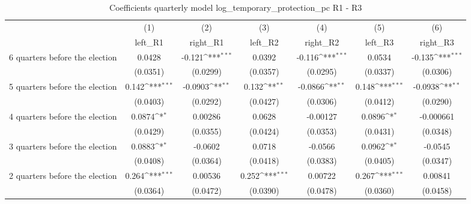 \begin{table}[htbp]\centering
\def\sym#1{\ifmmode^{#1}\else\(^{#1}\)\fi}
\caption{Coefficients quarterly model log\_temporary\_protection\_pc R1 - R3}
\begin{tabular}{l*{6}{c}}
\hline\hline
                    &\multicolumn{1}{c}{(1)}&\multicolumn{1}{c}{(2)}&\multicolumn{1}{c}{(3)}&\multicolumn{1}{c}{(4)}&\multicolumn{1}{c}{(5)}&\multicolumn{1}{c}{(6)}\\
                    &\multicolumn{1}{c}{left\_R1}&\multicolumn{1}{c}{right\_R1}&\multicolumn{1}{c}{left\_R2}&\multicolumn{1}{c}{right\_R2}&\multicolumn{1}{c}{left\_R3}&\multicolumn{1}{c}{right\_R3}\\
\hline
 6 quarters before the election&      0.0428         &      -0.121\sym{***}&      0.0392         &      -0.116\sym{***}&      0.0534         &      -0.135\sym{***}\\
                    &    (0.0351)         &    (0.0299)         &    (0.0357)         &    (0.0295)         &    (0.0337)         &    (0.0306)         \\
[1em]
 5 quarters before the election&       0.142\sym{***}&     -0.0903\sym{**} &       0.132\sym{**} &     -0.0866\sym{**} &       0.148\sym{***}&     -0.0938\sym{**} \\
                    &    (0.0403)         &    (0.0292)         &    (0.0427)         &    (0.0306)         &    (0.0412)         &    (0.0290)         \\
[1em]
 4 quarters before the election&      0.0874\sym{*}  &     0.00286         &      0.0628         &    -0.00127         &      0.0896\sym{*}  &   -0.000661         \\
                    &    (0.0429)         &    (0.0355)         &    (0.0424)         &    (0.0353)         &    (0.0431)         &    (0.0348)         \\
[1em]
 3 quarters before the election&      0.0883\sym{*}  &     -0.0602         &      0.0718         &     -0.0566         &      0.0962\sym{*}  &     -0.0545         \\
                    &    (0.0408)         &    (0.0364)         &    (0.0418)         &    (0.0383)         &    (0.0405)         &    (0.0347)         \\
[1em]
 2 quarters before the election&       0.264\sym{***}&     0.00536         &       0.252\sym{***}&     0.00722         &       0.267\sym{***}&     0.00841         \\
                    &    (0.0364)         &    (0.0472)         &    (0.0390)         &    (0.0478)         &    (0.0360)         &    (0.0458)         \\

\end{tabular}
\end{table}
